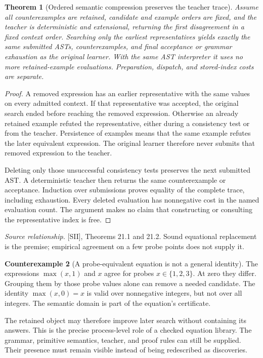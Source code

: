 \documentclass[11pt,oneside,openany]{book}
\newtheorem{theorem}{Theorem}[chapter]
\theoremstyle{definition}\newtheorem{definition}[theorem]{Definition}
\newtheorem{counterexample}[theorem]{Counterexample}
\newcommand{\source}[1]{\par{\small\textit{Source relationship.} #1}\par}
\begin{document}
\begin{theorem}[Ordered semantic compression preserves the teacher trace]\label{r:ordered}
Assume all counterexamples are retained, candidate and example orders are fixed, and the teacher is deterministic and extensional, returning the first disagreement in a fixed context order. Searching only the earliest representatives yields exactly the same submitted ASTs, counterexamples, and final acceptance or grammar exhaustion as the original learner. With the same AST interpreter it uses no more retained-example evaluations. Preparation, dispatch, and stored-index costs are separate.
\end{theorem}
\begin{proof}
A removed expression has an earlier representative with the same values on every admitted context. If that representative was accepted, the original search ended before reaching the removed expression. Otherwise an already retained example refuted the representative, either during a consistency test or from the teacher. Persistence of examples means that the same example refutes the later equivalent expression. The original learner therefore never submits that removed expression to the teacher.

Deleting only those unsuccessful consistency tests preserves the next submitted AST. A deterministic teacher then returns the same counterexample or acceptance. Induction over submissions proves equality of the complete trace, including exhaustion. Every deleted evaluation has nonnegative cost in the named evaluation count. The argument makes no claim that constructing or consulting the representative index is free.
\end{proof}
\source{[SII], Theorems 21.1 and 21.2. Sound equational replacement is the premise; empirical agreement on a few probe points does not supply it.}

\begin{counterexample}[A probe-equivalent equation is not a general identity]\label{ce:probe}
The expressions $\max(x,1)$ and $x$ agree for probes $x\in\{1,2,3\}$. At zero they differ. Grouping them by those probe values alone can remove a needed candidate. The identity $\max(x,0)=x$ is valid over nonnegative integers, but not over all integers. The semantic domain is part of the equation's certificate.
\end{counterexample}

The retained object may therefore improve later search without containing its answers. This is the precise process-level role of a checked equation library. The grammar, primitive semantics, teacher, and proof rules can still be supplied. Their presence must remain visible instead of being redescribed as discoveries.
\end{document}

